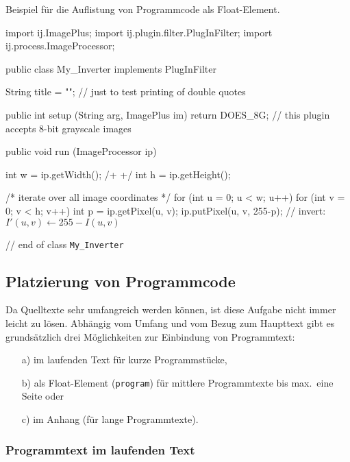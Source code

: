 \begin{program}
\caption{Beispiel für die Auflistung von Programmcode als Float-Element.}
\label{prog:CodeExample}
\begin{JavaCode}
import ij.ImagePlus;
import ij.plugin.filter.PlugInFilter;
import ij.process.ImageProcessor;

public class My_Inverter implements PlugInFilter {

  String title = ""; // just to test printing of double quotes

	public int setup (String arg, ImagePlus im) {
		return DOES_8G;	// this plugin accepts 8-bit grayscale images \label{pr:IjSamplePlugin10}
	}

	public void run (ImageProcessor ip) {
		int w = ip.getWidth();	/+ \label{ExampleCodeLabel} +/
		int h = ip.getHeight(); 
		
		/* iterate over all image coordinates */
		for (int u = 0; u < w; u++) { 
			for (int v = 0; v < h; v++) {
				int p = ip.getPixel(u, v); 
				ip.putPixel(u, v, 255-p); // invert: $I'(u,v) \leftarrow 255 - I(u,v)$\label{MathInCode}
			}
		}
	}
			
} // end of class {\tt My\_Inverter}
\end{JavaCode}
%
\end{program}


\subsection{Platzierung von Programmcode}

Da Quelltexte sehr umfangreich werden können, ist diese Aufgabe nicht
immer leicht zu lösen. Abhängig vom Umfang und vom Bezug zum Haupttext
gibt es grundsätzlich drei Möglichkeiten zur Einbindung von Programmtext:
%
\begin{itemize}
\item[a)] im laufenden Text für kurze Programmstücke,
\item[b)] als Float-Element (\texttt{program}) für mittlere Programmtexte bis max.\ eine Seite oder
\item[c)] im Anhang (für lange Programmtexte).
\end{itemize}

\subsubsection{Programmtext im laufenden Text}

